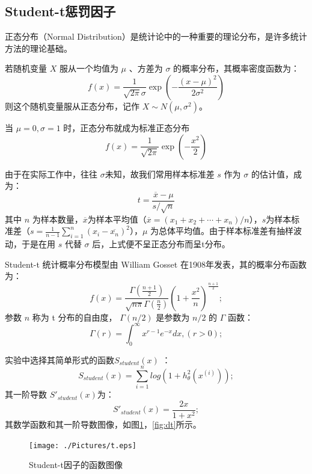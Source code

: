 \documentclass[oneside]{ZJUthesis}
\begin{document}
\subsection{Student-t惩罚因子}
正态分布（Normal Distribution）是统计论中的一种重要的理论分布，是许多统计方法的理论基础。
\begin{defn}[正态分布]
	若随机变量 $X$ 服从一个均值为 $\mu$ 、方差为 $\sigma$ 的概率分布，其概率密度函数为：
	\begin{equation}
	f(x)=\frac{1}{\sqrt{2\pi}\sigma}\exp\left(-\frac{(x-\mu)^2}{2\sigma^2}\right)
	\end{equation}
	则这个随机变量服从正态分布，记作 $X\sim N(\mu,\sigma^2)$。
\end{defn}
\begin{defn}[标准正态分布]
	当 $\mu=0,\sigma=1$ 时，正态分布就成为标准正态分布
	\begin{equation}
	f(x)=\frac{1}{\sqrt{2\pi}}\exp\left(-\frac{x^2}{2}\right)
	\end{equation}
\end{defn}

由于在实际工作中，往往 $\sigma$未知，故我们常用样本标准差 $s$ 作为 $\sigma$ 的估计值，成为：
\begin{equation}
	t=\frac{\overline x-\mu}{s/\sqrt{n}}
\end{equation}
其中 $n$ 为样本数量，$\overline x$为样本平均值（$\overline x=(x_1+x_2+\cdots+x_n)/n$），$s$为样本标准差（$s=\frac{1}{n-1}\sum\limits_{i=1}^n{(x_i-\overline {x_n})^2}$），$\mu$ 为总体平均值。由于样本标准差有抽样波动，于是在用 $s$ 代替 $\sigma$ 后，上式便不呈正态分布而呈t分布。

Student-t 统计概率分布模型由 William Gosset 在1908年发表\cite{DBLP:conf/nips/WellingHO02}，其的概率分布函数为：
\begin{equation}
	f(x)=\frac{\Gamma(\frac{n+1}{2})}{\sqrt{n\pi}\Gamma(\frac{n}{2})}(1+\frac{x^2}{n})^{\frac{n+1}{2}};
\end{equation}
参数 $n$ 称为 t 分布的自由度， $\Gamma(n/2)$ 是参数为 $n/2$ 的 $\Gamma$ 函数：
\begin{equation}
	\Gamma(r)=\int_0^\infty{x^{r-1}e^{-x}dx},(r>0);
\end{equation}

实验中选择其简单形式的函数$S_{student}(x)$ ：
\begin{equation}
S_{student}(x)=\sum\limits_{i=1}^{n}{log(1+h_{\theta}^2(x^{(i)}))};
\end{equation}
其一阶导数 $S'_{student}(x)$为：
\begin{equation}
S'_{student}(x)=\frac{2x}{1+x^2};
\end{equation}
其数学函数和其一阶导数图像，如图\ref{fig:t}，\ref{fig:dt}所示。
\begin{figure}[h]
\centering
\texttt{[image: ./Pictures/t.eps]}
\caption{Student-t因子的函数图像}
\label{fig:t}
\end{figure}
\end{document}
